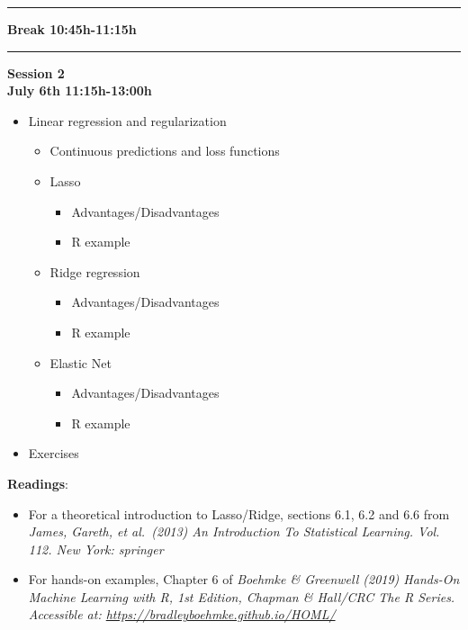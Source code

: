 \documentclass[
]{book}
\providecommand{\tightlist}{%
  \setlength{\itemsep}{0pt}\setlength{\parskip}{0pt}}
\begin{document}
\begin{center}\rule{0.5\linewidth}{\linethickness}\end{center}

\textbf{Break 10:45h-11:15h}

\begin{center}\rule{0.5\linewidth}{\linethickness}\end{center}

\textbf{Session 2}\\
\textbf{July 6th 11:15h-13:00h}

\begin{itemize}
\tightlist
\item
  Linear regression and regularization

  \begin{itemize}
  \tightlist
  \item
    Continuous predictions and loss functions
  \item
    Lasso

    \begin{itemize}
    \tightlist
    \item
      Advantages/Disadvantages
    \item
      R example
    \end{itemize}
  \item
    Ridge regression

    \begin{itemize}
    \tightlist
    \item
      Advantages/Disadvantages
    \item
      R example
    \end{itemize}
  \item
    Elastic Net

    \begin{itemize}
    \tightlist
    \item
      Advantages/Disadvantages
    \item
      R example
    \end{itemize}
  \end{itemize}
\item
  Exercises
\end{itemize}

\textbf{Readings}:

\begin{itemize}
\item
  For a theoretical introduction to Lasso/Ridge, sections 6.1, 6.2 and 6.6 from \emph{James, Gareth, et al.~(2013) An Introduction To Statistical Learning. Vol. 112. New York: springer}
\item
  For hands-on examples, Chapter 6 of \emph{Boehmke \& Greenwell (2019) Hands-On Machine Learning with R, 1st Edition, Chapman \& Hall/CRC The R Series. Accessible at: \url{https://bradleyboehmke.github.io/HOML/}}
\end{itemize}
\end{document}
